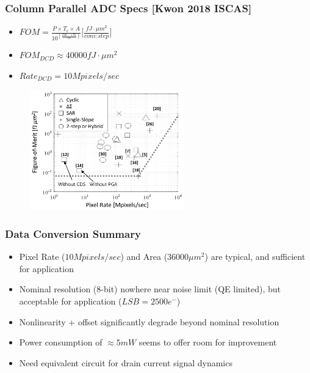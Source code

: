\documentclass{beamer}
\begin{document}
\begin{frame}
    \frametitle{Column Parallel ADC Specs [Kwon 2018 ISCAS]}
    \begin{itemize}
        \item $FOM=\frac{P\times T_c \times A}{10^(\frac{DR-1.76}{10})}\bigr[\frac{fJ \cdot \mu m^2 }{conv.step}\bigl]$
        \item $FOM_{DCD}\approx40000fJ \cdot \mu m^2$
        \item $Rate_{DCD}=10Mpixels/sec$
    \end{itemize}
    \begin{figure}
        \includegraphics[width=0.6\textwidth]{fom.png}
    \end{figure}
\end{frame}

\begin{frame}
    \frametitle{Data Conversion Summary}
    \begin{itemize}
    \item Pixel Rate ($10Mpixels/sec$) and Area ($36000\mu m^2$) are typical, and sufficient for application
    \item Nominal resolution (8-bit) nowhere near noise limit (QE limited), but acceptable for application ($LSB=2500e^-$)
    \item Nonlinearity + offset significantly degrade beyond nominal resolution
    \item Power consumption of $\approx 5 mW$ seems to offer room for improvement
    \item Need equivalent circuit for drain current signal dynamics
    \end{itemize}
\end{frame}

\end{document}
